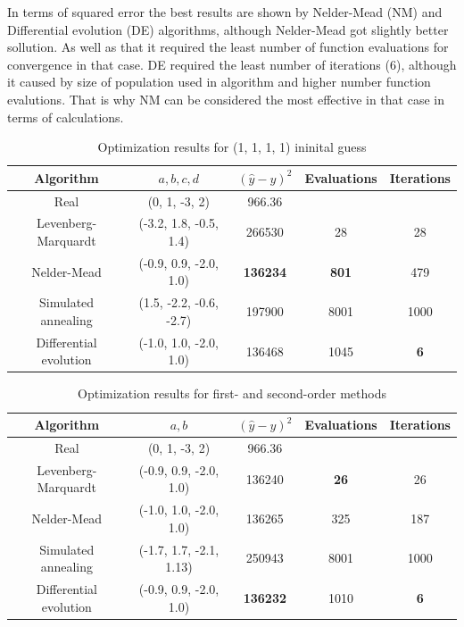 In terms of squared error the best results are shown by Nelder-Mead (NM) and Differential evolution (DE) algorithms, although Nelder-Mead got slightly better sollution.
As well as that it required the least number of function evaluations for convergence in that case. DE required the least number of iterations (6), although it caused by size of population
used in algorithm and higher number function evalutions. That is why NM can be considered the most effective in that case in terms of calculations. 

\begin{table}[h!]
    \begin{center}
        \caption{Optimization results for (1, 1, 1, 1) ininital guess}
        \label{table:direct-methods}
        \begin{tabular}{|c|c|c|c|c|}
            \label{tab:aprox_first}
            \textbf{Algorithm} & \textbf{$a, b, c, d$} & \textbf{$(\hat{y} - y)^2$} & \textbf{Evaluations} & \textbf{Iterations}\\
            \hline
            Real & (0, 1, -3, 2) & 966.36 & &\\
            Levenberg-Marquardt & (-3.2, 1.8, -0.5, 1.4) & 266530 & 28 & 28 \\
            Nelder-Mead & (-0.9, 0.9, -2.0, 1.0) & \textbf{136234} & \textbf{801} & 479 \\
            Simulated annealing & (1.5, -2.2, -0.6, -2.7) & 197900 & 8001 & 1000 \\
            Differential evolution &  (-1.0, 1.0, -2.0, 1.0) & 136468 & 1045 & \textbf{6} \\
        \end{tabular}
    \end{center}
\end{table}

\begin{table}[h!]
    \begin{center}
        \caption{Optimization results for first- and second-order methods}
        \label{tab:aprox_second}
        \begin{tabular}{|c|c|c|c|c|}
            \textbf{Algorithm} & \textbf{$a, b$} & \textbf{$(\hat{y} - y)^2$} & \textbf{Evaluations} & \textbf{Iterations}\\
            \hline
            Real & (0, 1, -3, 2) & 966.36 & &\\
            Levenberg-Marquardt & (-0.9, 0.9, -2.0, 1.0) & 136240 & \textbf{26} & 26 \\
            Nelder-Mead & (-1.0, 1.0, -2.0, 1.0) & 136265 & 325 & 187 \\
            Simulated annealing & (-1.7, 1.7, -2.1, 1.13) & 250943 & 8001 & 1000 \\
            Differential evolution &  (-0.9, 0.9, -2.0, 1.0) & \textbf{136232} & 1010 & \textbf{6} \\
        \end{tabular}
    \end{center}
\end{table}

